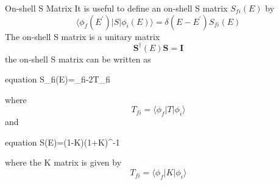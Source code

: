 \documentclass{beamer}
\begin{document}
		\begin{frame}{On-shell S Matrix}
		It is useful to define an on-shell S matrix $S_{fi}(E)$ by
		\begin{equation}
			\langle \phi_f(E^\prime)|S|\phi_i(E)\rangle=\delta(E-E^\prime)S_{fi}(E)
		\end{equation}
		The on-shell S matrix is a unitary matrix
		\begin{equation}
			\mathbf{S}^\dagger(E)\mathbf{S}=\mathbf{I}
		\end{equation}
		the on-shell S matrix can be written as
		\begin{empheq}[box=\fbox]{equation}
			S_{fi}(E)=\delta_{fi}-2\pi{}T_{fi}
		\end{empheq}
		where
		\begin{equation}
			T_{fi}=\langle \phi_f|T|\phi_i\rangle
		\end{equation}
		and
		\begin{empheq}[box=\fbox]{equation}
			S(E)=(1-\pi{}K)(1+\pi{}K)^{-1}
		\end{empheq}
		where the K matrix is given by
		\begin{equation}
			T_{fi}=\langle \phi_f|K|\phi_i\rangle
		\end{equation}
	\end{frame}
\end{document}
